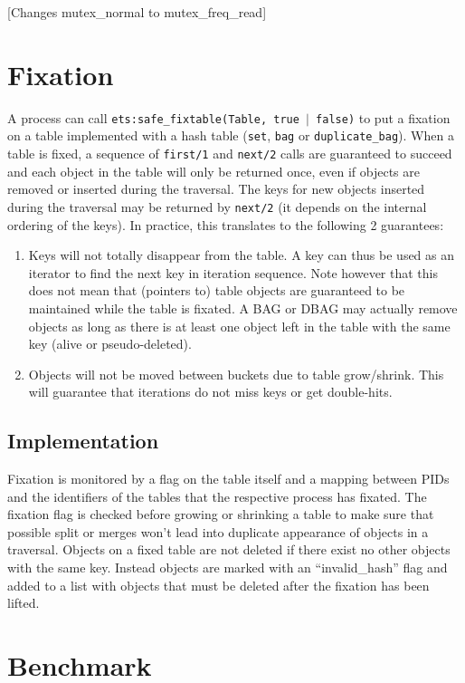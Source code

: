 \documentclass[aps,pre,preprint,nofootinbib]{revtex4}
\begin{document}
[Changes mutex\_normal to mutex\_freq\_read]

\section{Fixation}

A process can call \texttt{ets:safe\_fixtable(Table, true $|$ false)} to put a fixation on a table implemented with a hash table (\verb|set|, \verb|bag| or \verb|duplicate_bag|).
When a table is fixed, a sequence of \verb|first/1| and \verb|next/2| calls are guaranteed to succeed and each object in the table will only be returned once, even if objects are removed or inserted during the traversal.
The keys for new objects inserted during the traversal may be returned by \verb|next/2| (it depends on the internal ordering of the keys).
In practice, this translates to the following 2 guarantees:

\begin{enumerate}
  \item Keys will not totally disappear from the table.
    A key can thus be used as an iterator to find the next key in iteration sequence.
    Note however that this does not mean that (pointers to) table objects are guaranteed to be maintained while the table is fixated.
    A BAG or DBAG may actually remove objects as long as there is at least one object left in the table with the same key (alive or pseudo-deleted).
    \item Objects will not be moved between buckets due to table grow/shrink.
      This will guarantee that iterations do not miss keys or get double-hits.
\end{enumerate}

\subsection{Implementation}

Fixation is monitored by a flag on the table itself and a mapping between PIDs and the identifiers of the tables that the respective process has fixated.
The fixation flag is checked before growing or shrinking a table to make sure that possible split or merges won't lead into duplicate appearance of objects in a traversal.
Objects on a fixed table are not deleted if there exist no other objects with the same key.
Instead objects are marked with an ``invalid\_hash'' flag and added to a list with objects that must be deleted after the fixation has been lifted.

\section{Benchmark} \label{sec:benchmark}
\end{document}
